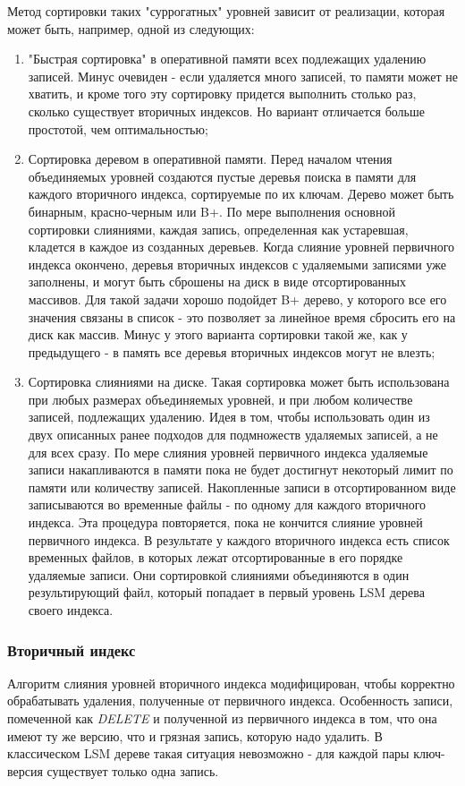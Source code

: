\documentclass[a4paper,hidelinks,12pt]{article}
\begin{document}
Метод сортировки таких "суррогатных" уровней зависит от реализации, которая
может быть, например, одной из следующих:
\begin{enumerate}
\item "Быстрая сортировка" в оперативной памяти всех подлежащих удалению
записей. Минус очевиден - если удаляется много записей, то памяти может не
хватить, и кроме того эту сортировку придется выполнить столько раз, сколько
существует вторичных индексов. Но вариант отличается больше простотой, чем
оптимальностью;
\item Сортировка деревом в оперативной памяти. Перед началом чтения объединяемых
уровней создаются пустые деревья поиска в памяти для каждого вторичного индекса,
сортируемые по их ключам. Дерево может быть бинарным, красно-черным или B+.
По мере выполнения основной сортировки слияниями, каждая запись, определенная
как устаревшая, кладется в каждое из созданных деревьев. Когда слияние уровней
первичного индекса окончено, деревья вторичных индексов с удаляемыми записями
уже заполнены, и могут быть сброшены на диск в виде отсортированных массивов.
Для такой задачи хорошо подойдет B+ дерево, у которого все его значения связаны
в список - это позволяет за линейное время сбросить его на диск как массив.
Минус у этого варианта сортировки такой же, как у предыдущего - в память все
деревья вторичных индексов могут не влезть;
\item Сортировка слияниями на диске. Такая сортировка может быть использована
при любых размерах объединяемых уровней, и при любом количестве записей,
подлежащих удалению. Идея в том, чтобы использовать один из двух описанных
ранее подходов для подмножеств удаляемых записей, а не для всех сразу. По мере
слияния уровней первичного индекса удаляемые записи накапливаются в памяти пока
не будет достигнут некоторый лимит по памяти или количеству записей. Накопленные
записи в отсортированном виде записываются во временные файлы - по одному для
каждого вторичного индекса. Эта процедура повторяется, пока не кончится слияние
уровней первичного индекса. В результате у каждого вторичного индекса есть
список временных файлов, в которых лежат отсортированные в его порядке удаляемые
записи. Они сортировкой слияниями объединяются в один результирующий файл,
который попадает в первый уровень LSM дерева своего индекса.
\end{enumerate}

\subsubsection{Вторичный индекс}
Алгоритм слияния уровней вторичного индекса модифицирован, чтобы корректно
обрабатывать удаления, полученные от первичного индекса. Особенность записи,
помеченной как \textit{DELETE} и полученной из первичного индекса в том, что она
имеют ту же версию, что и грязная запись, которую надо удалить. В классическом
LSM дереве такая ситуация невозможно - для каждой пары ключ-версия существует
только одна запись.
\end{document}
